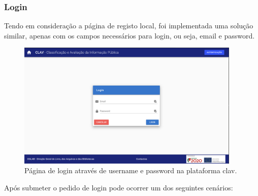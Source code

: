 \vspace{-4mm}
\subsubsection{Login}

Tendo em consideração a página de registo local, foi implementada uma solução similar, apenas com os campos necessários para login, ou seja, email e password.

\begin{figure}[h!]
    \centering
    \includegraphics[width=0.95\textwidth]{img/clav/authlocal/login.png}
    \caption{Página de login através de username e password na plataforma \gls{clav}.}
    \label{fig:paginaLoginLocal}
\end{figure}

Após submeter o pedido de login pode ocorrer um dos seguintes cenários:

